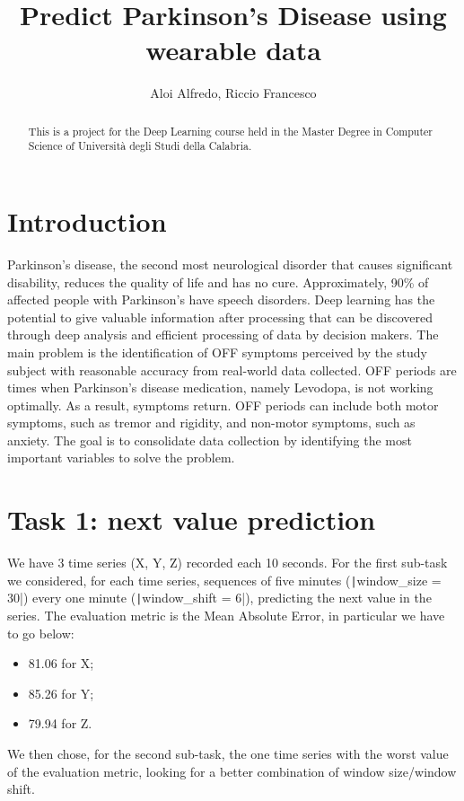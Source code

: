\documentclass[12pt,a4paper,leqno]{article}
\title{Predict Parkinson's Disease using wearable data}
\author{Aloi Alfredo, Riccio Francesco}
\begin{document}
	
	\maketitle
	
	\begin{abstract}
		This is a project for the Deep Learning course held in the Master Degree in Computer Science of Università degli Studi della Calabria.
	\end{abstract}
	
	\newpage
	
	\tableofcontents
	
	\newpage
	
	\section{Introduction}
	Parkinson's disease, the second most neurological disorder that causes significant disability, reduces the quality of life and has no cure. Approximately, 90\% of affected people with Parkinson's have speech disorders. Deep learning has the potential to give valuable information after processing that can be discovered through deep analysis and efficient processing of data by decision makers. The main problem is the identification of OFF symptoms perceived by the study subject with reasonable accuracy from real-world data collected. OFF periods are times when Parkinson’s disease medication, namely Levodopa, is not working optimally. As a result, symptoms return. OFF periods can include both motor symptoms, such as tremor and rigidity, and non-motor symptoms, such as anxiety. The goal is to consolidate data collection by identifying the most important variables to solve the problem.
	
	\newpage
	
	\section{Task 1: next value prediction}
	We have 3 time series (X, Y, Z) recorded each 10 seconds. For the first sub-task we considered, for each time series, sequences of five minutes (\texttt|window_size = 30|) every one minute (\texttt|window_shift = 6|), predicting the next value in the series. The evaluation metric is the Mean Absolute Error, in particular we have to go below:
	\begin{itemize}
		\item 81.06 for X;
		\item 85.26 for Y;
		\item 79.94 for Z.
	\end{itemize}
	We then chose, for the second sub-task, the one time series with the worst value of the evaluation metric, looking for a better combination of window size/window shift.
	
\end{document}
